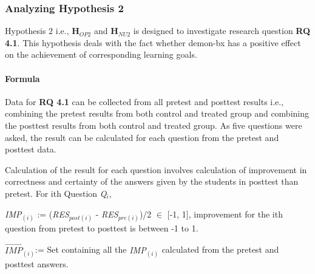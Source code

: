 \subsubsection{Analyzing Hypothesis 2}\label{subsubsec:hypothesis2}
Hypothesis 2 i.e., \textbf{H$_{OP2}$} and \textbf{H$_{NU2}$} is designed to investigate research question \textbf{RQ 4.1}. This hypothesis deals with the fact whether demon-bx has a positive effect on the achievement of corresponding learning goals.

\paragraph{Formula}
Data for \textbf{RQ 4.1} can be collected from all pretest and posttest results i.e., combining the pretest results from both control and treated group and combining the posttest results from both control and treated group. As five questions were asked, the result can be calculated for each question from the pretest and posttest data. 

Calculation of the result for each question involves calculation of improvement in correctness and certainty of the answers given by the students in posttest than pretest. For ith Question \textit{Q$_{i}$},

\textit{IMP$_{(i)}$} := (\textit{RES$_{post(i)}$} - \textit{RES$_{pre(i)}$})/2 $\in$ [-1,  1], improvement for the ith question from pretest to posttest is between -1 to 1.

$\overrightarrow{\textit{IMP}}$\textit{$_{(i)}$}:= Set containing all the \textit{IMP$_{(i)}$} calculated from the pretest and posttest answers.

